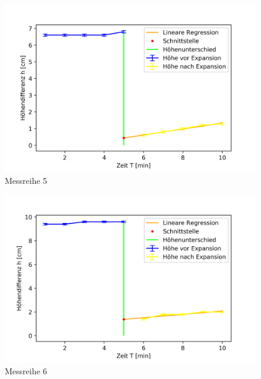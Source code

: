 \documentclass[bibliography=totocnumbered]{scrartcl}
\begin{document}
\begin{figure}[!ht]
	\centering									%
	\includegraphics[width=400pt]{fotos/gpr1/Temperaturkorrektor 1. Messung.png}			%
	\caption{Messreihe 5}							%
	\label{Abb: Sara 1}							%
\end{figure}
\begin{figure}[!ht]
	\centering									%
	\includegraphics[width=400pt]{fotos/gpr1/Temperaturkorrektor 2. Messung.png}			%
	\caption{Messreihe 6}							%
	\label{Abb: Sara 2}							%
\end{figure}
\newpage
\end{document}
